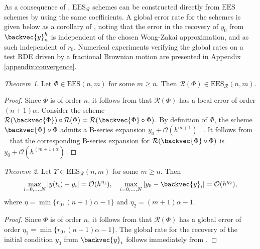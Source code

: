 \documentclass{article} %
\theoremstyle{definition}
\theoremstyle{remark}
\newtheorem{theorem}{Theorem}[section]
\begin{document}
As a consequence of \citet[Theorem 3.3]{redmann2020runge}, $\mathrm{EES}_\mathcal{R}$ schemes can be constructed directly from $\mathrm{EES}$ schemes by using the same coefficients. A global error rate for the schemes is given below as a corollary of \cite[Theorem 4.2]{redmann2020runge}, noting that the error in the recovery of $y_0$ from $\backvec{y}_n^h$ is independent of the chosen Wong-Zakai approximation, and as such independent of $r_0$. Numerical experiments verifying the global rates on a test RDE driven by a fractional Brownian motion are presented in Appendix \ref{appendix:convergence}.\par\medskip

\begin{theorem}\label{thm:ees_local}
    Let $\Phi \in \mathrm{EES}(n,m)$ for some $m \geq n$. Then $\mathcal{R}(\Phi) \in \mathrm{EES}_\mathcal{R}(n,m)$.
\end{theorem}
\begin{proof}
    Since $\Phi$ is of order $n$, it follows from \cite[Theorem 3.3]{redmann2020runge} that $\mathcal{R}(\Phi)$ has a local error of order $(n+1)\alpha$. Consider the scheme $\mathcal{R}(\backvec{\Phi}) \circ \mathcal{R}(\Phi) = \mathcal{R}(\backvec{\Phi} \circ \Phi)$. By definition of $\Phi$, the scheme $\backvec{\Phi} \circ \Phi$ admits a B-series expansion $y_0 + \mathcal{O}(h^{m+1})$ ~\citep{shmelev2025explicit}. It follows from ~\citet{redmann2020runge} that the corresponding B-series expansion for $\mathcal{R}(\backvec{\Phi} \circ \Phi)$ is $y_0 + \mathcal{O}(h^{(m+1)\alpha})$.
\end{proof}

\begin{theorem}\label{thm:ees_global}
    Let $\Upsilon \in \mathrm{EES}_\mathcal{R}(n,m)$ for some $m \geq n$. Then
    \begin{equation*}
        \max_{i = 0, \ldots, N}|y(t_i) - y_i| = \mathcal{O}(h^{\eta_1}), \quad \max_{i = 0, \ldots, N}\left|y_0 - \backvec{y}_i\right| = \mathcal{O}(h^{\eta_2}),
    \end{equation*}
    where $\eta = \min\{r_0, (n+1)\alpha - 1\}$ and $\eta_2 = (m+1)\alpha - 1$.
\end{theorem}

\begin{proof}
    Since $\Phi$ is of order $n$, it follows from \cite[Theorem 4.2]{redmann2020runge} that $\mathcal{R}(\Phi)$ has a global error of order $\eta_1 = \min\{r_0, (n+1)\alpha - 1\}$. The global rate for the recovery of the initial condition $y_0$ from $\backvec{y}_i$ follows immediately from \citet[Proposition 4.1]{redmann2020runge}.
\end{proof}
\end{document}
